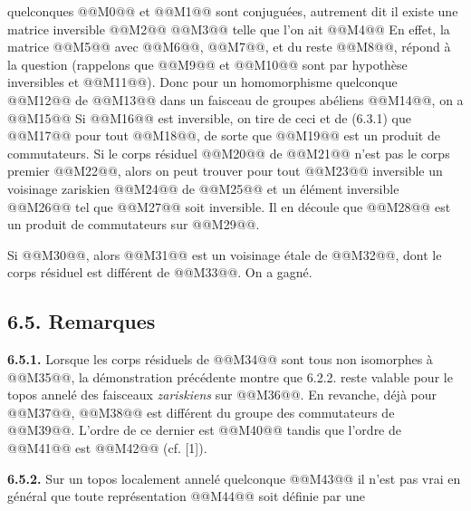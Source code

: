 
quelconques @@M0@@ et @@M1@@ sont conjuguées, autrement dit il existe une matrice inversible @@M2@@ @@M3@@ telle que l'on ait
@@M4@@
En effet, la matrice @@M5@@ avec @@M6@@, @@M7@@, et du reste @@M8@@, répond à la question (rappelons que @@M9@@ et @@M10@@ sont par hypothèse inversibles et @@M11@@). Donc pour un homomorphisme quelconque @@M12@@ de @@M13@@ dans un faisceau de groupes abéliens @@M14@@, on a
@@M15@@
Si @@M16@@ est inversible, on tire de ceci et de (6.3.1) que @@M17@@ pour tout @@M18@@, de sorte que @@M19@@ est un produit de commutateurs. Si le corps résiduel @@M20@@ de @@M21@@ n'est pas le corps premier @@M22@@, alors on peut trouver pour tout @@M23@@ inversible un voisinage zariskien @@M24@@ de @@M25@@ et un élément inversible @@M26@@ tel que @@M27@@ soit inversible. Il en découle que @@M28@@ est un produit de commutateurs sur @@M29@@.

Si @@M30@@, alors @@M31@@ est un voisinage étale de @@M32@@, dont le corps résiduel est différent de @@M33@@. On a gagné.

\subsection*{6.5. Remarques}
\textbf{6.5.1.} Lorsque les corps résiduels de @@M34@@ sont tous non isomorphes à @@M35@@, la démonstration précédente montre que 6.2.2. reste valable pour le topos annelé des faisceaux \emph{zariskiens} sur @@M36@@. En revanche, déjà pour @@M37@@, @@M38@@ est différent du groupe des commutateurs de @@M39@@. L'ordre de ce dernier est @@M40@@ tandis que l'ordre de @@M41@@ est @@M42@@ (cf. [1]).

\textbf{6.5.2.} Sur un topos localement annelé quelconque @@M43@@ il n'est pas vrai en général que toute représentation @@M44@@ soit définie par une
